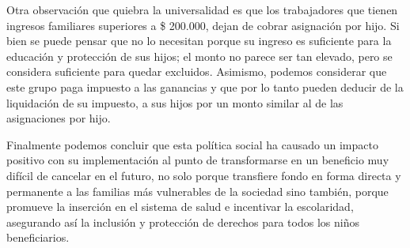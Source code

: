 \documentclass[
  12,
]{article}
\begin{document}
Otra observación que quiebra la universalidad es que los trabajadores
que tienen ingresos familiares superiores a \$ 200.000, dejan de cobrar
asignación por hijo. Si bien se puede pensar que no lo necesitan porque
su ingreso es suficiente para la educación y protección de sus hijos; el
monto no parece ser tan elevado, pero se considera suficiente para
quedar excluidos. Asimismo, podemos considerar que este grupo paga
impuesto a las ganancias y que por lo tanto pueden deducir de la
liquidación de su impuesto, a sus hijos por un monto similar al de las
asignaciones por hijo.

Finalmente podemos concluir que esta política social ha causado un
impacto positivo con su implementación al punto de transformarse en un
beneficio muy difícil de cancelar en el futuro, no solo porque
transfiere fondo en forma directa y permanente a las familias más
vulnerables de la sociedad sino también, porque promueve la inserción en
el sistema de salud e incentivar la escolaridad, asegurando así la
inclusión y protección de derechos para todos los niños beneficiarios.
\end{document}
